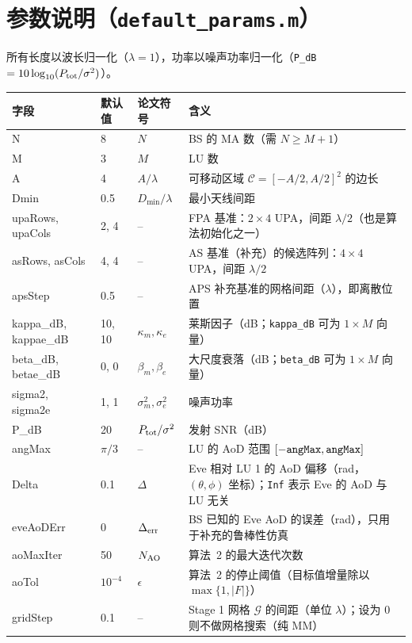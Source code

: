 \documentclass[11pt,a4paper]{ctexart}
\newcommand{\code}[1]{\texttt{#1}}
\newcommand{\Ptot}{P_{\rm tot}}
\begin{document}
\section{参数说明（\code{default\_params.m}）}\label{sec:prm}
所有长度以波长归一化（$\lambda=1$），功率以噪声功率归一化（\code{P\_dB} $=10\log_{10}(\Ptot/\sigma^2)$）。
\begin{longtable}{>{\ttfamily}p{2.75cm}p{1.6cm}p{2.0cm}p{8.65cm}}
\toprule
字段 & 默认值 & 论文符号 & 含义 \\ \midrule
N & 8 & $N$ & BS 的 MA 数（需 $N\ge M+1$）\\
M & 3 & $M$ & LU 数 \\
A & 4 & $A/\lambda$ & 可移动区域 $\mathcal C=[-A/2,A/2]^2$ 的边长 \\
Dmin & 0.5 & $D_{\min}/\lambda$ & 最小天线间距 \\
upaRows, upaCols & 2, 4 & -- & FPA 基准：$2\times4$ UPA，间距 $\lambda/2$（也是算法初始化之一）\\
asRows, asCols & 4, 4 & -- & AS 基准（补充）的候选阵列：$4\times4$ UPA，间距 $\lambda/2$ \\
apsStep & 0.5 & -- & APS 补充基准的网格间距（$\lambda$），即离散位置 \\
kappa\_dB, kappae\_dB & 10, 10 & $\kappa_m,\kappa_e$ & 莱斯因子（dB；\code{kappa\_dB} 可为 $1\times M$ 向量）\\
beta\_dB, betae\_dB & 0, 0 & $\beta_m,\beta_e$ & 大尺度衰落（dB；\code{beta\_dB} 可为 $1\times M$ 向量）\\
sigma2, sigma2e & 1, 1 & $\sigma_m^2,\sigma_e^2$ & 噪声功率 \\
P\_dB & 20 & $\Ptot/\sigma^2$ & 发射 SNR（dB）\\
angMax & $\pi/3$ & -- & LU 的 AoD 范围 $[-{\tt angMax},{\tt angMax}]$ \\
Delta & 0.1 & $\Delta$ & Eve 相对 LU 1 的 AoD 偏移（rad，$(\theta,\phi)$ 坐标）；\code{Inf} 表示 Eve 的 AoD 与 LU 无关 \\
eveAoDErr & 0 & $\Delta_{\rm err}$ & BS 已知的 Eve AoD 的误差（rad），只用于补充的鲁棒性仿真 \\ \midrule
aoMaxIter & 50 & $N_{\rm AO}$ & 算法~2 的最大迭代次数 \\
aoTol & $10^{-4}$ & $\epsilon$ & 算法~2 的停止阈值（目标值增量除以 $\max\{1,|F|\}$） \\
gridStep & 0.1 & -- & Stage 1 网格 $\mathcal G$ 的间距（单位 $\lambda$）；设为 0 则不做网格搜索（纯 MM）\\

\end{longtable}
\end{document}

